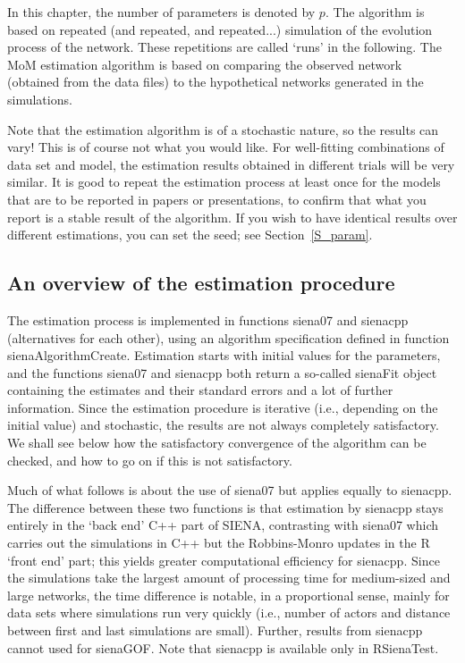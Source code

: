 \documentclass[a4paper,fleqn,11pt]{article}
\newcommand{\+}{\, + \,}
\newcommand{\sfn}[1]{\textsf{#1}}
\newcommand{\si}{{\sf SIENA}}
\begin{document}
In this chapter, the number of
parameters is denoted by $p$. The algorithm is based on repeated
(and repeated, and repeated...) simulation of the evolution
process of the network. These repetitions are called `runs' in the
following. The MoM estimation algorithm is based on comparing the
observed network (obtained from the data files)
to the hypothetical networks generated in the simulations.

Note that the estimation algorithm is of a stochastic nature, so
the results can vary! This is of course not what you would like.
For well-fitting combinations of data set and model, the
estimation results obtained in different trials will be very
similar. It is good to repeat the estimation process at least once
for the models that are to be reported in papers or presentations,
to confirm that what you report is a stable result of the algorithm.
If you wish to have identical results over different estimations,
you can set the seed; see Section~\ref{S_param}.

\subsection{An overview of the estimation procedure}
\hypertarget{T_S_options}{   }

The estimation process is implemented in functions \textsf{siena07}
and \sfn{sienacpp} (alternatives for each other),
using an algorithm specification defined in function \textsf{sienaAlgorithmCreate}.
Estimation starts with initial values for the parameters,
and the functions \textsf{siena07} and \sfn{sienacpp} both return a
so-called \textsf{sienaFit} object containing the estimates and their standard errors and
a lot of further information.
Since the estimation procedure is iterative (i.e., depending on the
initial value) and stochastic,
the results are not always completely satisfactory. We shall see below
how the satisfactory convergence of the algorithm can be checked,
and how to go on if this is not satisfactory.




Much of what follows is about the use of \sfn{siena07}
but applies equally to \sfn{sienacpp}.
The difference between these two functions is that
estimation by \sfn{sienacpp} stays entirely in the
`back end' \sfn{C++} part of \si, contrasting with \sfn{siena07}
which carries out the simulations in \sfn{C++} but the
Robbins-Monro updates in the \sfn{R} `front end' part;
this yields greater computational efficiency for \sfn{sienacpp}.
Since the simulations take the largest amount of processing time
for medium-sized and large networks, the time difference is
notable, in a proportional sense, mainly for data sets
where simulations run very quickly (i.e., number of actors
and distance between first and last simulations are small).
Further, results from \sfn{sienacpp} cannot used for
\sfn{sienaGOF}.
Note that \sfn{sienacpp} is available only in \sfn{RSienaTest}.
\end{document}
